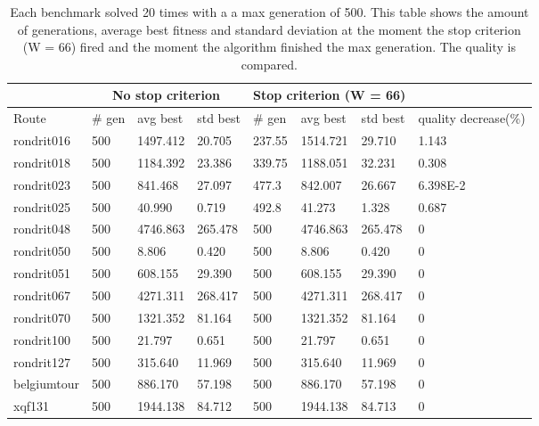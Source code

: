 \begin{table}[ht!]
    \centering
    \begin{tabular}{ | l || l | l | l || l | l | l || l | }
    \hline
     & \multicolumn{3}{|c|}{No stop criterion} & \multicolumn{3}{|c|}{Stop criterion (W = 66)} & \\
    \hline
	Route & \# gen & avg best & std best & \# gen & avg best & std best & quality decrease(\%) \\ \hline
	rondrit016 & 500 & 1497.412 & 20.705 & 237.55 & 1514.721 & 29.710 & 1.143 \  \\ \hline
	rondrit018 & 500 & 1184.392 & 23.386 & 339.75 & 1188.051 & 32.231 & 0.308 \  \\ \hline
	rondrit023 & 500 & 841.468 & 27.097 & 477.3 & 842.007 & 26.667 & 6.398E-2 \  \\ \hline
	rondrit025 & 500 & 40.990 & 0.719 & 492.8 & 41.273 & 1.328 & 0.687 \  \\ \hline
	rondrit048 & 500 & 4746.863 & 265.478 & 500 & 4746.863 & 265.478 & 0 \  \\ \hline
	rondrit050 & 500 & 8.806 & 0.420 & 500 & 8.806 & 0.420 & 0 \  \\ \hline
	rondrit051 & 500 & 608.155 & 29.390 & 500 & 608.155 & 29.390 & 0 \  \\ \hline
	rondrit067 & 500 & 4271.311 & 268.417 & 500 & 4271.311 & 268.417 & 0 \  \\ \hline
	rondrit070 & 500 & 1321.352 & 81.164 & 500 & 1321.352 & 81.164 & 0 \  \\ \hline
	rondrit100 & 500 & 21.797 & 0.651 & 500 & 21.797 & 0.651 & 0 \  \\ \hline
	rondrit127 & 500 & 315.640 & 11.969 & 500 & 315.640 & 11.969 & 0 \  \\ \hline
	belgiumtour & 500 & 886.170 & 57.198 & 500 & 886.170 & 57.198 & 0 \  \\ \hline
	xqf131 & 500 & 1944.138 & 84.712 & 500 & 1944.138 & 84.713 & 0 \  \\ \hline
    \end{tabular}
    \caption{Each benchmark solved 20 times with a a max generation of 500. This table shows the amount of generations, average best fitness and standard deviation at the moment the stop criterion (W = 66) fired and the moment the algorithm finished the max generation. The quality is compared.}
    \label{tab:window66}
\end{table}

